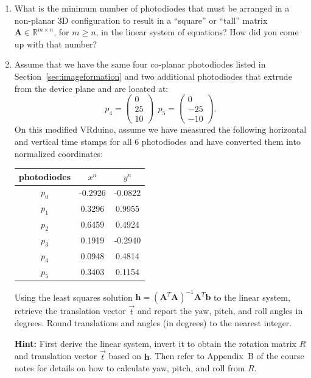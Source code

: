 \documentclass[conference]{styles/acmsiggraph}
\newcommand{\pointsin}[1]{\normalfont{(\textit{#1pts})}}
\begin{document}
\begin{enumerate}[label=(\roman*)]
\item What is the minimum number of photodiodes that must be arranged in a non-planar 3D configuration to result in a ``square'' or ``tall'' matrix $\boldsymbol{A} \in \mathbb{R}^{m \times n}$, for $m \geq n$, in the linear system of equations? How did you come up with that number? \pointsin{10}
\item Assume that we have the same four co-planar photodiodes listed in Section~\ref{sec:imageformation} and two additional photodiodes that extrude from the device plane and are located at:
%
$$p_4 = \begin{pmatrix}
0 \\ 25 \\ 10
\end{pmatrix}\ \
p_5 = \begin{pmatrix}
0 \\ -25 \\ -10
\end{pmatrix}.$$
%
On this modified VRduino, assume we have measured the following horizontal and vertical time stamps for all 6 photodiodes and have converted them into normalized coordinates:
%
\begin{center}
\begin{tabular}{ c|c|c }
\hline \hline
photodiodes & $x^n$ & $y^n$ \\
 \hline
 $p_0$ & -0.2926 & -0.0822 \\
 $p_1$ & 0.3296 & 0.9955 \\
 $p_2$ & 0.6459 &  0.4924 \\
 $p_3$ & 0.1919 & -0.2940 \\
 $p_4$ & 0.0948 & 0.4814 \\
 $p_5$ & 0.3403 & 0.1154 \\
 \hline \hline
\end{tabular}
\end{center}
%
Using the least squares solution $\boldsymbol{h} = (\boldsymbol{A}^T \boldsymbol{A})^{-1} \boldsymbol{A}^T \boldsymbol{b}$ to the linear system, retrieve the translation vector $\vec{t}$ and report the yaw, pitch, and roll angles in degrees. Round translations and angles (in degrees) to the nearest integer. \pointsin{10}

\textbf{Hint:} First derive the linear system, invert it to obtain the rotation matrix $R$ and translation vector $\vec{t}$ based on $\boldsymbol{h}$. Then refer to Appendix~B of the course notes for details on how to calculate yaw, pitch, and roll from $R$.
\end{enumerate}
\end{document}
